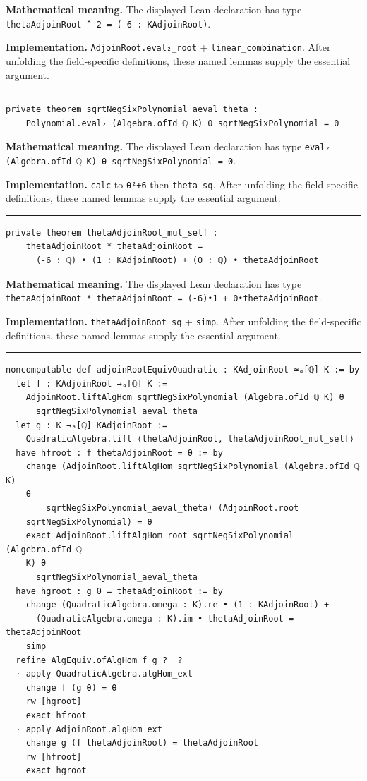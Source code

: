 \documentclass[UTF8,a4paper,11pt,fontset=fandol]{ctexart}
\theoremstyle{definition}
\newcommand{\statementsep}{\par\medskip\hrule\medskip}
\begin{document}
\noindent\textbf{Mathematical meaning.} The displayed Lean declaration has type \texttt{thetaAdjoinRoot \textasciicircum{} 2 = (-6 : KAdjoinRoot)}.\par
\noindent\textbf{Implementation.} \texttt{AdjoinRoot.\allowbreak{}eval₂\_\allowbreak{}root} + \texttt{linear\_\allowbreak{}combination}. After unfolding the field-specific definitions, these named lemmas supply the essential argument.\par
\statementsep
\begin{verbatim}
private theorem sqrtNegSixPolynomial_aeval_theta :
    Polynomial.eval₂ (Algebra.ofId ℚ K) θ sqrtNegSixPolynomial = 0
\end{verbatim}
\noindent\textbf{Mathematical meaning.} The displayed Lean declaration has type \texttt{eval₂ (Algebra.\allowbreak{}ofId ℚ K) θ sqrtNegSixPolynomial = 0}.\par
\noindent\textbf{Implementation.} \texttt{calc} to \texttt{θ²+6} then \texttt{theta\_\allowbreak{}sq}. After unfolding the field-specific definitions, these named lemmas supply the essential argument.\par
\statementsep
\begin{verbatim}
private theorem thetaAdjoinRoot_mul_self :
    thetaAdjoinRoot * thetaAdjoinRoot =
      (-6 : ℚ) • (1 : KAdjoinRoot) + (0 : ℚ) • thetaAdjoinRoot
\end{verbatim}
\noindent\textbf{Mathematical meaning.} The displayed Lean declaration has type \texttt{thetaAdjoinRoot * thetaAdjoinRoot = (-6)•1 + 0•thetaAdjoinRoot}.\par
\noindent\textbf{Implementation.} \texttt{thetaAdjoinRoot\_\allowbreak{}sq} + \texttt{simp}. After unfolding the field-specific definitions, these named lemmas supply the essential argument.\par
\statementsep
\begin{verbatim}
noncomputable def adjoinRootEquivQuadratic : KAdjoinRoot ≃ₐ[ℚ] K := by
  let f : KAdjoinRoot →ₐ[ℚ] K :=
    AdjoinRoot.liftAlgHom sqrtNegSixPolynomial (Algebra.ofId ℚ K) θ
      sqrtNegSixPolynomial_aeval_theta
  let g : K →ₐ[ℚ] KAdjoinRoot :=
    QuadraticAlgebra.lift ⟨thetaAdjoinRoot, thetaAdjoinRoot_mul_self⟩
  have hfroot : f thetaAdjoinRoot = θ := by
    change (AdjoinRoot.liftAlgHom sqrtNegSixPolynomial (Algebra.ofId ℚ K)
    θ
        sqrtNegSixPolynomial_aeval_theta) (AdjoinRoot.root
    sqrtNegSixPolynomial) = θ
    exact AdjoinRoot.liftAlgHom_root sqrtNegSixPolynomial (Algebra.ofId ℚ
    K) θ
      sqrtNegSixPolynomial_aeval_theta
  have hgroot : g θ = thetaAdjoinRoot := by
    change (QuadraticAlgebra.omega : K).re • (1 : KAdjoinRoot) +
      (QuadraticAlgebra.omega : K).im • thetaAdjoinRoot = thetaAdjoinRoot
    simp
  refine AlgEquiv.ofAlgHom f g ?_ ?_
  · apply QuadraticAlgebra.algHom_ext
    change f (g θ) = θ
    rw [hgroot]
    exact hfroot
  · apply AdjoinRoot.algHom_ext
    change g (f thetaAdjoinRoot) = thetaAdjoinRoot
    rw [hfroot]
    exact hgroot
\end{verbatim}
\end{document}
